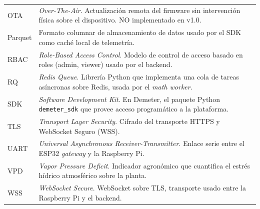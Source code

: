 \begin{table}[H]
\begin{tabularx}{\textwidth}{lX}
        OTA                            & \textit{Over-The-Air}. Actualización remota del firmware sin intervención física sobre el dispositivo. NO implementado en v1.0. \\
        Parquet                        & Formato columnar de almacenamiento de datos usado por el SDK como caché local de telemetría. \\
        RBAC                           & \textit{Role-Based Access Control}. Modelo de control de acceso basado en roles (admin, viewer) usado por el backend. \\
        RQ                             & \textit{Redis Queue}. Librería Python que implementa una cola de tareas asíncronas sobre Redis, usada por el \textit{math worker}. \\
        SDK                            & \textit{Software Development Kit}. En Demeter, el paquete Python \texttt{demeter\_sdk} que provee acceso programático a la plataforma. \\
        TLS                            & \textit{Transport Layer Security}. Cifrado del transporte HTTPS y WebSocket Seguro (WSS). \\
        UART                           & \textit{Universal Asynchronous Receiver-Transmitter}. Enlace serie entre el ESP32 \textit{gateway} y la Raspberry Pi. \\
        VPD                            & \textit{Vapor Pressure Deficit}. Indicador agronómico que cuantifica el estrés hídrico atmosférico sobre la planta. \\
        WSS                            & \textit{WebSocket Secure}. WebSocket sobre TLS, transporte usado entre la Raspberry Pi y el backend. \\
        \bottomrule
    \end{tabularx}
    \label{tab:glosario}
\end{table}

